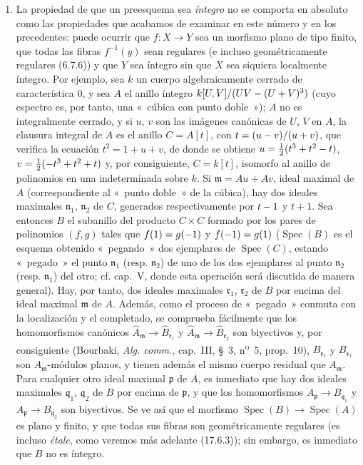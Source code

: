 \begin{remarks}[6.5.5]
\begin{enumerate}
\item[(ii)] La propiedad de que un preesquema sea \emph{íntegro} no se
comporta en absoluto como las propiedades que acabamos de examinar en este
número y en los precedentes: puede ocurrir que $f:X\to Y$ sea un morfismo
plano de tipo finito, que todas las fibras $f^{-1}(y)$ sean regulares (e
incluso geométricamente regulares (6.7.6)) y que $Y$ sea íntegro sin que $X$
sea siquiera localmente íntegro. Por ejemplo, sea $k$ un cuerpo
algebraicamente cerrado de característica $0$, y sea
$A$ el anillo íntegro $k[U,V]/(UV-(U+V)^3)$ (cuyo espectro es, por tanto, una
«~cúbica con punto doble~»); $A$ no es integralmente cerrado, y si $u$, $v$
son las imágenes canónicas de $U$, $V$ en $A$, la clausura integral de $A$
es el anillo $C=A[t]$, con
$t=(u- v)/(u+v)$, que verifica la ecuación $t^2=1+u+v$, de donde se obtiene
$u=\frac{1}{2}(t^3+t^2- t)$,
$v=\frac{1}{2}(- t^3+t^2+t)$
y, por consiguiente, $C=k[t]$, isomorfo al anillo de polinomios en una
indeterminada sobre $k$. Si $\mathfrak m=Au+Av$, ideal maximal de $A$
(correspondiente al «~punto doble~» de la cúbica), hay dos ideales maximales
$\mathfrak n_1$, $\mathfrak n_2$ de $C$, generados respectivamente por $t- 1$
y $t+1$. Sea entonces $B$ el subanillo del producto $C\times C$ formado por
los pares de polinomios $(f,g)$ tales que $f(1)=g(- 1)$ y $f(- 1)=g(1)$
($\operatorname{Spec}(B)$ es el esquema obtenido «~pegando~» dos ejemplares
de $\operatorname{Spec}(C)$, estando «~pegado~» el punto $\mathfrak n_1$
(resp. $\mathfrak n_2$) de uno de los dos ejemplares al punto
$\mathfrak n_2$ (resp. $\mathfrak n_1$) del otro; cf. cap.~V, donde esta
operación será discutida de manera general). Hay, por tanto, dos ideales
maximales $\mathfrak r_1$, $\mathfrak r_2$ de $B$ por encima del ideal
maximal $\mathfrak m$ de $A$. Además, como el proceso de «~pegado~» conmuta
con la localización y el completado, se comprueba fácilmente que los
homomorfismos canónicos
$\widehat A_{\mathfrak m}\to\widehat B_{\mathfrak r_1}$ y
$\widehat A_{\mathfrak m}\to\widehat B_{\mathfrak r_2}$
son biyectivos y, por consiguiente (Bourbaki, \emph{Alg. comm.}, cap.~III,
\S~3, n\textsuperscript{o}~5, prop.~10), $B_{\mathfrak r_1}$ y
$B_{\mathfrak r_2}$ son $A_{\mathfrak m}$-módulos planos, y tienen además el
mismo cuerpo residual que $A_{\mathfrak m}$. Para cualquier otro ideal
maximal $\mathfrak p$ de $A$, es inmediato que hay dos ideales maximales
$\mathfrak q_1$, $\mathfrak q_2$ de $B$ por encima de $\mathfrak p$, y que
los homomorfismos $A_{\mathfrak p}\to B_{\mathfrak q_1}$ y
$A_{\mathfrak p}\to B_{\mathfrak q_2}$ son biyectivos. Se ve así que el
morfismo $\operatorname{Spec}(B)\to\operatorname{Spec}(A)$ es plano y
finito, y que todas sus fibras son geométricamente regulares (es incluso
\emph{\'etale}, como veremos más adelante (17.6.3)); sin embargo, es
inmediato que $B$ no es íntegro.
\end{enumerate}
\end{remarks}
